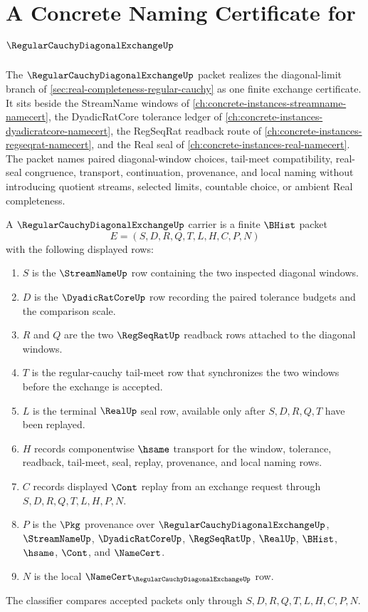 \chapter{A Concrete Naming Certificate for $\RegularCauchyDiagonalExchangeUp$}
\label{ch:concrete-instances-regular-cauchy-diagonal-exchange-namecert}

The $\RegularCauchyDiagonalExchangeUp$ packet realizes the diagonal-limit branch of \autoref{sec:real-completeness-regular-cauchy} as one finite exchange certificate. It sits beside the StreamName windows of \autoref{ch:concrete-instances-streamname-namecert}, the DyadicRatCore tolerance ledger of \autoref{ch:concrete-instances-dyadicratcore-namecert}, the RegSeqRat readback route of \autoref{ch:concrete-instances-regseqrat-namecert}, and the Real seal of \autoref{ch:concrete-instances-real-namecert}. The packet names paired diagonal-window choices, tail-meet compatibility, real-seal congruence, transport, continuation, provenance, and local naming without introducing quotient streams, selected limits, countable choice, or ambient Real completeness.

\begin{definition}
\label{def:regular-cauchy-diagonal-exchange-carrier}
A $\RegularCauchyDiagonalExchangeUp$ carrier is a finite $\BHist$ packet
$$
E=(S,D,R,Q,T,L,H,C,P,N)
$$
with the following displayed rows:
\begin{enumerate}
\item $S$ is the $\StreamNameUp$ row containing the two inspected diagonal windows.
\item $D$ is the $\DyadicRatCoreUp$ row recording the paired tolerance budgets and the comparison scale.
\item $R$ and $Q$ are the two $\RegSeqRatUp$ readback rows attached to the diagonal windows.
\item $T$ is the regular-cauchy tail-meet row that synchronizes the two windows before the exchange is accepted.
\item $L$ is the terminal $\RealUp$ seal row, available only after $S,D,R,Q,T$ have been replayed.
\item $H$ records componentwise $\hsame$ transport for the window, tolerance, readback, tail-meet, seal, replay, provenance, and local naming rows.
\item $C$ records displayed $\Cont$ replay from an exchange request through $S,D,R,Q,T,L,H,P,N$.
\item $P$ is the $\Pkg$ provenance over $\RegularCauchyDiagonalExchangeUp$, $\StreamNameUp$, $\DyadicRatCoreUp$, $\RegSeqRatUp$, $\RealUp$, $\BHist$, $\hsame$, $\Cont$, and $\NameCert$.
\item $N$ is the local $\NameCert_{\RegularCauchyDiagonalExchangeUp}$ row.
\end{enumerate}
The classifier compares accepted packets only through $S,D,R,Q,T,L,H,C,P,N$.
\end{definition}

